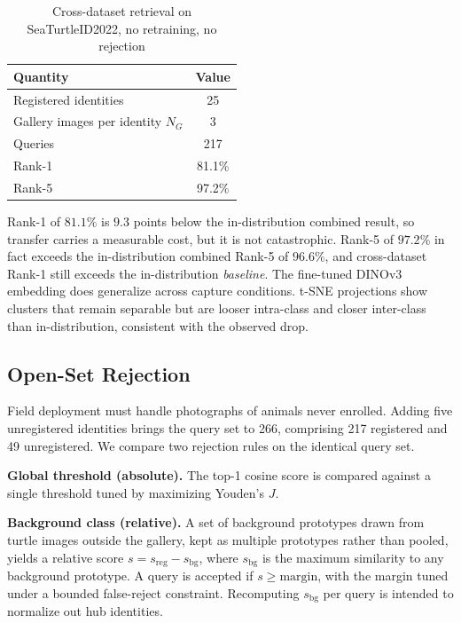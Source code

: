 \documentclass[conference]{IEEEtran}
\begin{document}
\begin{table}[t]
  \caption{Cross-dataset retrieval on SeaTurtleID2022, no retraining, no rejection}
  \label{tab:crossdata}
  \centering
  \footnotesize
  \begin{tabular}{@{}lc@{}}
    \toprule
    \textbf{Quantity}                 & \textbf{Value} \\
    \midrule
    Registered identities             & 25             \\
    Gallery images per identity $N_G$ & 3              \\
    Queries                           & 217            \\
    Rank-1                            & 81.1\%         \\
    Rank-5                            & 97.2\%         \\
    \bottomrule
  \end{tabular}
\end{table}

Rank-1 of $81.1\%$ is $9.3$ points below the in-distribution combined result, so
transfer carries a measurable cost, but it is not catastrophic. Rank-5 of $97.2\%$ in
fact exceeds the in-distribution combined Rank-5 of $96.6\%$, and cross-dataset Rank-1
still exceeds the in-distribution \emph{baseline}. The fine-tuned DINOv3 embedding does
generalize across capture conditions. t-SNE projections show clusters that remain
separable but are looser intra-class and closer inter-class than in-distribution,
consistent with the observed drop.

\subsection{Open-Set Rejection}

Field deployment must handle photographs of animals never enrolled. Adding five
unregistered identities brings the query set to 266, comprising 217 registered and 49
unregistered. We compare two rejection rules on the identical query set.

\textbf{Global threshold (absolute).} The top-1 cosine score is compared against a
single threshold tuned by maximizing Youden's $J$.

\textbf{Background class (relative).} A set of background prototypes drawn from turtle
images outside the gallery, kept as multiple prototypes rather than pooled, yields a
relative score $s = s_{\text{reg}} - s_{\text{bg}}$, where $s_{\text{bg}}$ is the maximum
similarity to any background prototype. A query is accepted if $s \geq \text{margin}$,
with the margin tuned under a bounded false-reject constraint. Recomputing
$s_{\text{bg}}$ per query is intended to normalize out hub identities.
\end{document}
